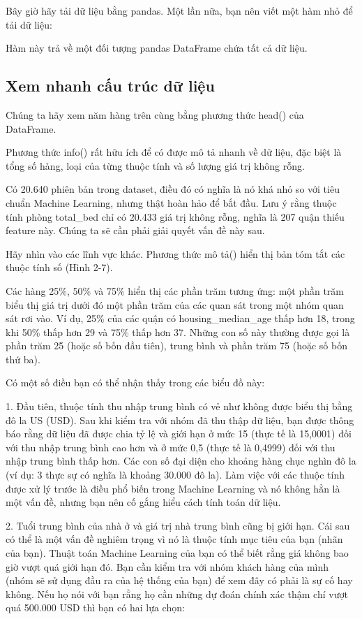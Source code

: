 Bây giờ hãy tải dữ liệu bằng pandas. Một lần nữa, bạn nên viết một hàm nhỏ để tải dữ liệu:

Hàm này trả về một đối tượng pandas DataFrame chứa tất cả dữ liệu.

\subsection{Xem nhanh cấu trúc dữ liệu}

Chúng ta hãy xem năm hàng trên cùng bằng phương thức head() của DataFrame.

Phương thức info() rất hữu ích để có được mô tả nhanh về dữ liệu, đặc biệt là tổng số hàng, loại của từng thuộc tính và số lượng giá trị không rỗng.

Có 20.640 phiên bản trong dataset, điều đó có nghĩa là nó khá nhỏ so với tiêu chuẩn Machine Learning, nhưng thật hoàn hảo để bắt đầu. Lưu ý rằng thuộc tính phòng total\_bed chỉ có 20.433 giá trị không rỗng, nghĩa là 207 quận thiếu feature này. Chúng ta sẽ cần phải giải quyết vấn đề này sau.

Hãy nhìn vào các lĩnh vực khác. Phương thức mô tả() hiển thị bản tóm tắt các thuộc tính số (Hình 2-7).

Các hàng 25\%, 50\% và 75\% hiển thị các phần trăm tương ứng: một phần trăm biểu thị giá trị dưới đó một phần trăm của các quan sát trong một nhóm quan sát rơi vào. Ví dụ, 25\% của các quận có housing\_median\_age thấp hơn 18, trong khi 50\% thấp hơn 29 và 75\% thấp hơn 37. Những con số này thường được gọi là phần trăm 25 (hoặc số bốn đầu tiên), trung bình và phần trăm 75 (hoặc số bốn thứ ba).

Có một số điều bạn có thể nhận thấy trong các biểu đồ này:

1. Đầu tiên, thuộc tính thu nhập trung bình có vẻ như không được biểu thị bằng đô la US (USD). Sau khi kiểm tra với nhóm đã thu thập dữ liệu, bạn được thông báo rằng dữ liệu đã được chia tỷ lệ và giới hạn ở mức 15 (thực tế là 15,0001) đối với thu nhập trung bình cao hơn và ở mức 0,5 (thực tế là 0,4999) đối với thu nhập trung bình thấp hơn. Các con số đại diện cho khoảng hàng chục nghìn đô la (ví dụ: 3 thực sự có nghĩa là khoảng 30.000 đô la). Làm việc với các thuộc tính được xử lý trước là điều phổ biến trong Machine Learning và nó không hẳn là một vấn đề, nhưng bạn nên cố gắng hiểu cách tính toán dữ liệu.

2. Tuổi trung bình của nhà ở và giá trị nhà trung bình cũng bị giới hạn. Cái sau có thể là một vấn đề nghiêm trọng vì nó là thuộc tính mục tiêu của bạn (nhãn của bạn). Thuật toán Machine Learning của bạn có thể biết rằng giá không bao giờ vượt quá giới hạn đó. Bạn cần kiểm tra với nhóm khách hàng của mình (nhóm sẽ sử dụng đầu ra của hệ thống của bạn) để xem đây có phải là sự cố hay không. Nếu họ nói với bạn rằng họ cần những dự đoán chính xác thậm chí vượt quá 500.000 USD thì bạn có hai lựa chọn:

